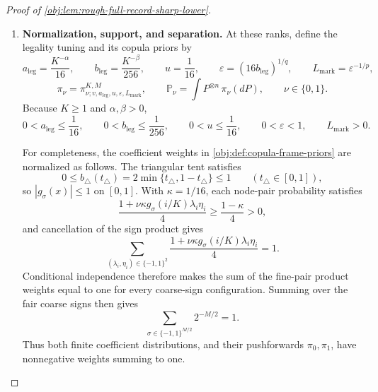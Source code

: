 \documentclass[11pt]{article}
\begin{document}
\begin{proof}[Proof of \cref{obj:lem:rough-full-record-sharp-lower}]
\begin{enumerate}
The definition of the threshold gives
\[
n\ge32^{D_p\gamma/(2S)},
\qquad
K^{S/\gamma}\ge n^{2S/(D_p\gamma)}\ge32.
\]
Thus the coarse target \(K^{S/\gamma}/16\) is at least \(2\).
Applying the floor inequalities to its base-two logarithm gives
\[
\frac{K^{S/\gamma}}{32}\le M
\le\frac{K^{S/\gamma}}{16},
\qquad M\ge2.
\]
Both ranks are powers of two. Since \(K\ge1\) and \(S/\gamma<1\),
\[
16M\le K^{S/\gamma}\le K,
\qquad
M\le K^{S/\gamma}.
\]
These are all the required rank-legality conditions.

\item \textbf{Normalization, support, and separation.}
At these ranks, define the legality tuning and its copula priors by
\[
a_{\mathrm{leg}}=\frac{K^{-\alpha}}{16},
\qquad
b_{\mathrm{leg}}=\frac{K^{-\beta}}{256},
\qquad
u=\frac1{16},
\qquad
\varepsilon=(16b_{\mathrm{leg}})^{1/q},
\qquad
L_{\mathrm{mark}}=\varepsilon^{-1/p},
\]
\[
\pi_\nu=\pi^{K,M}_{\nu;v,a_{\mathrm{leg}},u,\varepsilon,L_{\mathrm{mark}}},
\qquad
\mathbb P_\nu=\int P^{\otimes n}\,\pi_\nu(dP),
\qquad \nu\in\{0,1\}.
\]
Because \(K\ge1\) and \(\alpha,\beta>0\),
\[
0<a_{\mathrm{leg}}\le\frac1{16},
\qquad
0<b_{\mathrm{leg}}\le\frac1{256},
\qquad
0<u\le\frac1{16},
\qquad
0<\varepsilon<1,
\qquad L_{\mathrm{mark}}>0.
\]

For completeness, the coefficient weights in
\cref{obj:def:copula-frame-priors} are normalized as follows.
The triangular tent satisfies
\[
0\le b_\triangle(t_{\triangle})=2\min\{t_{\triangle},1-t_{\triangle}\}\le1
\qquad(t_{\triangle}\in[0,1]),
\]
so \(|g_\sigma(x)|\le1\) on \([0,1]\). With \(\kappa=1/16\), each node-pair probability satisfies
\[
\frac{1+\nu\kappa g_\sigma(i/K)\lambda_i\eta_i}{4}
\ge\frac{1-\kappa}{4}>0,
\]
and cancellation of the sign product gives
\[
\sum_{(\lambda_i,\eta_i)\in\{-1,1\}^2}
\frac{1+\nu\kappa g_\sigma(i/K)\lambda_i\eta_i}{4}
=1.
\]
Conditional independence therefore makes the sum of the fine-pair product weights equal to one for every coarse-sign configuration. Summing over the fair coarse signs then gives
\[
\sum_{\sigma\in\{-1,1\}^{M/2}}2^{-M/2}=1.
\]
Thus both finite coefficient distributions, and their pushforwards \(\pi_0,\pi_1\), have nonnegative weights summing to one.


\end{enumerate}
\end{proof}
\end{document}
